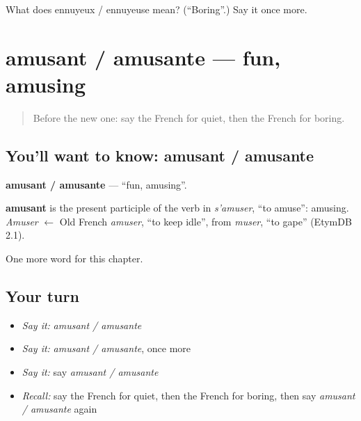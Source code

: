 \begin{tcolorbox}[breakable,colback=teal!4,colframe=teal!35!black,title={Before you move on}]
What does ennuyeux / ennuyeuse mean? (\textquotedblleft{}Boring\textquotedblright{}.) Say it once more.
\end{tcolorbox}
\section[amusant / amusante]{amusant / amusante — fun, amusing}

\label{lesson:FR-C219-amusant-amusante}



\begin{quote}
Before the new one: say the French for quiet, then the French for boring.
\end{quote}

\subsection*{You'll want to know: amusant / amusante}
\textbf{amusant / amusante} — \textquotedblleft{}fun, amusing\textquotedblright{}.

\begin{cousinweb}
\textbf{amusant} is the present participle of the verb in \emph{s'amuser}, \textquotedblleft{}to amuse\textquotedblright{}: amusing. \emph{Amuser} $\leftarrow$ Old French \emph{amuser}, \textquotedblleft{}to keep idle\textquotedblright{}, from \emph{muser}, \textquotedblleft{}to gape\textquotedblright{} (EtymDB 2.1).
\end{cousinweb}

\begin{grammarlens}[title={What you've built}]
One more word for this chapter.
\end{grammarlens}

\subsection*{Your turn}
\begin{itemize}
\raggedright
  \item \emph{Say it:} \emph{amusant / amusante}
  \item \emph{Say it:} \emph{amusant / amusante}, once more
  \item \emph{Say it:} say \emph{amusant / amusante}
  \item \emph{Recall:} say the French for quiet, then the French for boring, then say \emph{amusant / amusante} again
\end{itemize}

